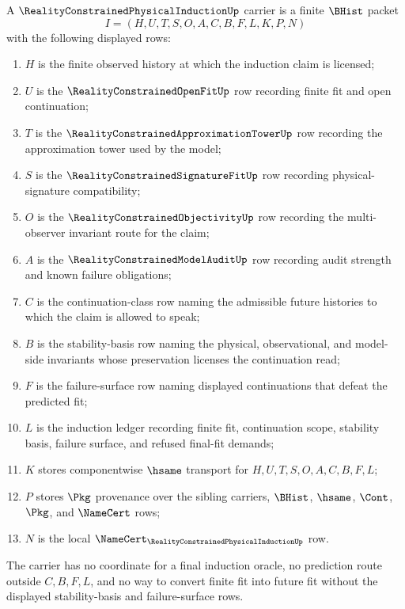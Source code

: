 \begin{definition}
\label{def:reality-constrained-physical-induction-carrier}
A $\RealityConstrainedPhysicalInductionUp$ carrier is a finite $\BHist$ packet
$$
I=(H,U,T,S,O,A,C,B,F,L,K,P,N)
$$
with the following displayed rows:
\begin{enumerate}
\item $H$ is the finite observed history at which the induction claim is licensed;
\item $U$ is the $\RealityConstrainedOpenFitUp$ row recording finite fit and open continuation;
\item $T$ is the $\RealityConstrainedApproximationTowerUp$ row recording the approximation tower used by the model;
\item $S$ is the $\RealityConstrainedSignatureFitUp$ row recording physical-signature compatibility;
\item $O$ is the $\RealityConstrainedObjectivityUp$ row recording the multi-observer invariant route for the claim;
\item $A$ is the $\RealityConstrainedModelAuditUp$ row recording audit strength and known failure obligations;
\item $C$ is the continuation-class row naming the admissible future histories to which the claim is allowed to speak;
\item $B$ is the stability-basis row naming the physical, observational, and model-side invariants whose preservation licenses the continuation read;
\item $F$ is the failure-surface row naming displayed continuations that defeat the predicted fit;
\item $L$ is the induction ledger recording finite fit, continuation scope, stability basis, failure surface, and refused final-fit demands;
\item $K$ stores componentwise $\hsame$ transport for $H,U,T,S,O,A,C,B,F,L$;
\item $P$ stores $\Pkg$ provenance over the sibling carriers, $\BHist$, $\hsame$, $\Cont$, $\Pkg$, and $\NameCert$ rows;
\item $N$ is the local $\NameCert_{\RealityConstrainedPhysicalInductionUp}$ row.
\end{enumerate}
The carrier has no coordinate for a final induction oracle, no prediction route outside $C,B,F,L$, and no way to convert finite fit into future fit without the displayed stability-basis and failure-surface rows.
\end{definition}

